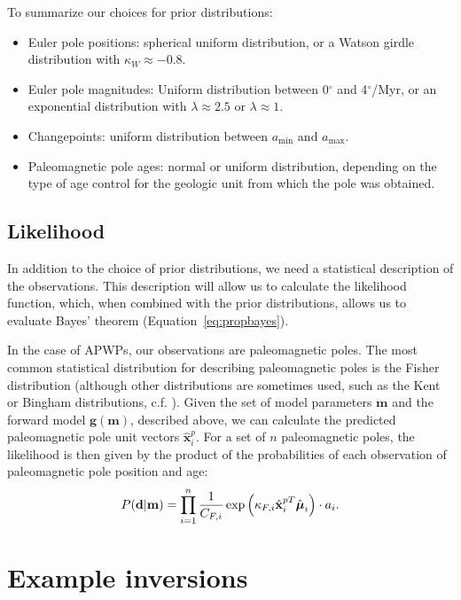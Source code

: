 \documentclass[11pt,letterpaper]{article}
\newcommand{\mitbf}[1]{\hbox{\mathversion{bold}$#1$}}
\begin{document}
To summarize our choices for prior distributions:
\begin{itemize}
\item Euler pole positions: spherical uniform distribution, or a Watson girdle distribution with $\kappa_W \approx -0.8$.
\item Euler pole magnitudes: Uniform distribution between 0$^\circ$ and 4$^\circ$/Myr, or an exponential distribution with $\lambda \approx 2.5$ or $\lambda \approx 1$.
\item Changepoints: uniform distribution between $a_\mathrm{min}$ and $a_\mathrm{max}$.
\item Paleomagnetic pole ages: normal or uniform distribution, depending on the type of age control for the geologic unit from which the pole was obtained.
\end{itemize}

\subsection*{Likelihood}
\label{sec:likelihood}
In addition to the choice of prior distributions, we need a statistical description of the observations. This description will allow us to calculate the likelihood function, which, when combined with the prior distributions, allows us to evaluate Bayes' theorem (Equation~\eqref{eq:propbayes}).

In the case of APWPs, our observations are paleomagnetic poles. The most common statistical distribution for describing paleomagnetic poles is the Fisher distribution (although other distributions are sometimes used, such as the Kent or Bingham distributions, c.f. \citealp{Tauxe2010a}). Given the set of model parameters $\mathbf{m}$ and the forward model $\mathbf{g}(\mathbf{m})$, described above, we can calculate the predicted paleomagnetic pole unit vectors $\hat{\mathbf{x}}_i^p$. For a set of $n$ paleomagnetic poles, the likelihood is then given by the product of the probabilities of each observation of paleomagnetic pole position and age:
\begin{equation}
P(\mathbf{d} \vert \mathbf{m}) = \displaystyle\prod_{i=1}^n \frac{1}{C_{F,i}} \exp \left( \kappa_{F,i} \hat{\mathbf{x}}_{i}^{pT} \hat{\mitbf{\mu}}_i \right) \cdot a_i.
\label{eq:model_likelihood}
\end{equation}

\section*{Example inversions}
\label{sec:example_inversion}
\end{document}
